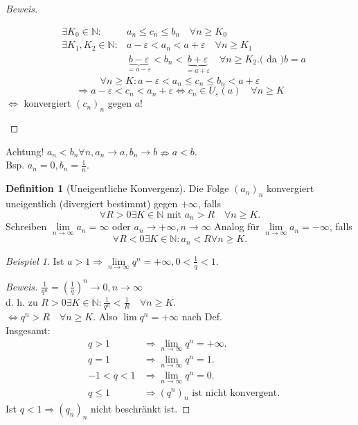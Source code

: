 \documentclass[12pt,a4paper,titlepage]{article} %
\theoremstyle{definition}
\newtheorem{defi}[satz]{Definition}
\theoremstyle{remark}
\newtheorem*{bsp}{Beispiel}
\newenvironment{bew}{\begin{proof}[Beweis]}{\end{proof}}
\newcommand{\N}{\mathbb{N}}
\newcommand{\limes}[1]{\lim\limits_{#1\rightarrow\infty}}
\begin{document}
\begin{bew}
\begin{enumerate}
\begin{align*}
			&\exists K_0 \in\N: &a_n \leq c_n \leq b_n \quad \forall n\geq K_0\\
			&\exists K_1, K_2 \in\N: &a-\varepsilon < a_n < a + \varepsilon \quad \forall n\geq K_1\\
			&&\underbrace{b-\varepsilon}_{=a-\varepsilon} < b_n < \underbrace{b + \varepsilon}_{=a+\varepsilon} \quad \forall n \geq K_2. \text{( da )}b=a
		\end{align*}
		\[\forall  n\geq K: a-\varepsilon < a_n \leq c_n \leq b_n < a+\varepsilon \]
		\[ \Rightarrow a-\varepsilon < c_n < a_n + \varepsilon \Leftrightarrow c_n\in U_\varepsilon(a) \quad \forall n\geq K \] 
		\( \Leftrightarrow \) konvergiert \((c_n)_n\) gegen \(a\)!
	\end{enumerate}
\end{bew}
Achtung! \(a_n < b_n \forall n, a_n \rightarrow a, b_n \rightarrow b \nRightarrow  a<b.\)\\Bsp. \(a_n = 0, b_n = \frac{1}{n}\).
\begin{defi}[Uneigentliche Konvergenz]
	Die Folge \((a_n)_n\) konvergiert uneigentlich (divergiert bestimmt) gegen \(+\infty\), falls 
	\[ \forall R>0 \exists K\in\N \text{ mit } a_n >R \quad \forall n\geq K. \]
	Schreiben \( \limes{n} a_n = \infty \) oder \( a_n \rightarrow +\infty, n\rightarrow \infty \)
	Analog für \( \limes{n} a_n = -\infty \), falls 
	\[ \forall R<0 \exists K\in\N: a_n < R \forall n\geq K. \]
\end{defi}
\begin{bsp}
	Ist \(a>1 \Rightarrow \limes{n}q^n = +\infty, 0< \frac{1}{q} < 1. \)
\end{bsp}
\begin{bew}
	\(\frac{1}{q^n} = \left( \frac{1}{q} \right)^n \rightarrow 0, n\rightarrow \infty  \)\\
	d. h. zu \(R>0 \exists K\in\N: \frac{1}{q^n} < \frac{1}{R} \quad \forall n\geq K. \)\\
	\( \Leftrightarrow q^n > R \quad \forall n\geq K. \) Also \(\lim q^n = +\infty \) nach Def.\\
	Insgesamt: 
	\begin{align*}
		&q>1 &\Rightarrow \limes{n}q^n = +\infty.\\
		&q=1 &\Rightarrow \limes{n}q^n = 1.\\
		&-1<q<1 & \Rightarrow \limes{n} q^n = 0.\\
		&q\leq 1 & \Rightarrow (q^n)_n \text{ ist nicht konvergent.}
	\end{align*}
	Ist \( q<1 \Rightarrow (q_n)_n \) nicht beschränkt ist.
\end{bew}
\end{document}
